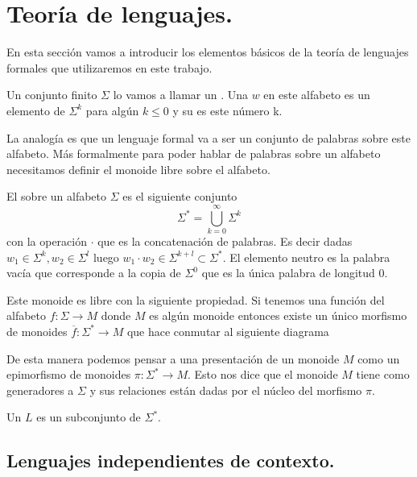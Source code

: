 \documentclass[tesis.tex]{subfiles}
\begin{document}
\chapter{Teoría de lenguajes.}	
En esta sección vamos a introducir los elementos básicos de la teoría de lenguajes formales que utilizaremos en este trabajo. 
\begin{deff}
Un conjunto finito $\Sigma$ lo vamos a llamar un . Una  $w$ en este alfabeto es un elemento de $\Sigma^k$ para algún $k \le 0$ y su  es este número k.
\end{deff}
La analogía es que un lenguaje formal va a ser un conjunto de palabras sobre este alfabeto. Más formalmente para poder hablar de palabras sobre un alfabeto necesitamos definir el monoide libre sobre el alfabeto.
\begin{deff}
	El  sobre un alfabeto $\Sigma$ es el siguiente conjunto
	\begin{equation*}
	\Sigma^{*} = \bigcup_{k=0}^{\infty} \Sigma^k
	\end{equation*}
	con la operación $\cdot$ que es la concatenación de palabras. Es decir dadas $w_1 \in \Sigma^{k}, w_2 \in \Sigma^{l}$ luego $w_1 \cdot w_2 \in \Sigma^{k+l} \subset \Sigma^*$. El elemento neutro es la palabra vacía que corresponde a la copia de $\Sigma^0$ que es la única palabra de longitud $0$. 
\end{deff}

\begin{obs}
	Este monoide es libre con la siguiente propiedad. Si tenemos una función del alfabeto $f: \Sigma \to M$ donde $M$ es algún monoide entonces existe un único morfismo de monoides $\overline f: \Sigma^{*} \to M$ que hace conmutar al siguiente diagrama
	
	
	
\end{obs}

\begin{obs}
	De esta manera podemos pensar a una {presentación} de un monoide $M$  como un epimorfismo de monoides $\pi: \Sigma^{*} \to M$. Esto nos dice que el monoide $M$ tiene como generadores a $\Sigma$ y sus relaciones están dadas por el núcleo del morfismo $\pi$.
\end{obs}

\begin{deff}
	Un  $L$ es un subconjunto de $\Sigma^{*}$. 
\end{deff}


\section{Lenguajes independientes de contexto.}
\end{document}
